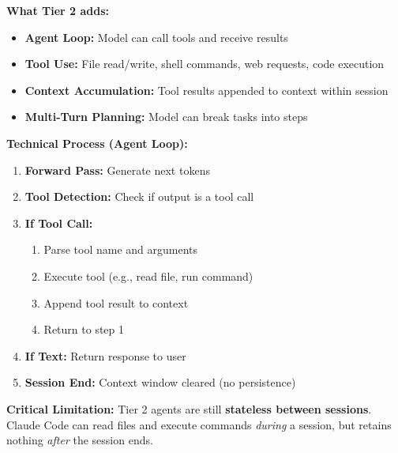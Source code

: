 \textbf{What Tier 2 adds:}
\begin{itemize}[nosep]
    \item \textbf{Agent Loop:} Model can call tools and receive results
    \item \textbf{Tool Use:} File read/write, shell commands, web requests, code execution
    \item \textbf{Context Accumulation:} Tool results appended to context within session
    \item \textbf{Multi-Turn Planning:} Model can break tasks into steps
\end{itemize}

\textbf{Technical Process (Agent Loop):}
\begin{enumerate}
    \item \textbf{Forward Pass:} Generate next tokens
    \item \textbf{Tool Detection:} Check if output is a tool call
    \item \textbf{If Tool Call:}
    \begin{enumerate}
        \item Parse tool name and arguments
        \item Execute tool (e.g., read file, run command)
        \item Append tool result to context
        \item Return to step 1
    \end{enumerate}
    \item \textbf{If Text:} Return response to user
    \item \textbf{Session End:} Context window cleared (no persistence)
\end{enumerate}

\textbf{Critical Limitation:} Tier 2 agents are still \textbf{stateless between sessions}. Claude Code can read files and execute commands \textit{during} a session, but retains nothing \textit{after} the session ends.

